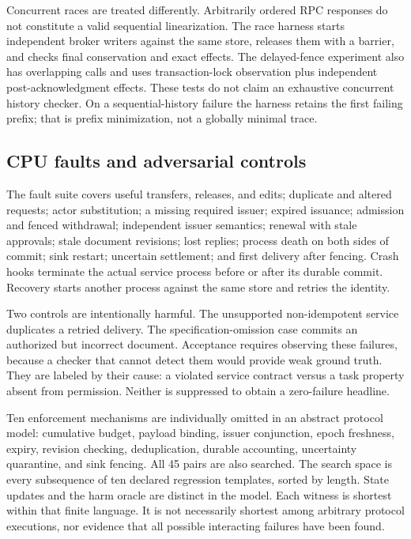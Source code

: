 Concurrent races are treated differently. Arbitrarily ordered RPC responses do
not constitute a valid sequential linearization. The race harness starts
independent broker writers against the same store, releases them with a barrier,
and checks final conservation and exact effects. The delayed-fence experiment
also has overlapping calls and uses transaction-lock observation plus independent
post-acknowledgment effects. These tests do not claim an exhaustive concurrent
history checker. On a sequential-history failure the harness retains the first
failing prefix; that is prefix minimization, not a globally minimal trace.

\subsection{CPU faults and adversarial controls}
The fault suite covers useful transfers, releases, and edits; duplicate and
altered requests; actor substitution; a missing required issuer; expired
issuance; admission and fenced withdrawal; independent issuer semantics;
renewal with stale approvals; stale document revisions; lost replies; process
death on both sides of commit; sink restart; uncertain settlement; and first
delivery after fencing. Crash hooks terminate the actual service process before
or after its durable commit. Recovery starts another process against the same
store and retries the identity.

Two controls are intentionally harmful. The unsupported non-idempotent service
duplicates a retried delivery. The specification-omission case commits an
authorized but incorrect document. Acceptance requires observing these failures,
because a checker that cannot detect them would provide weak ground truth.
They are labeled by their cause: a violated service contract versus a task
property absent from permission. Neither is suppressed to obtain a zero-failure
headline.

Ten enforcement mechanisms are individually omitted in an abstract protocol
model: cumulative budget, payload binding, issuer conjunction, epoch freshness,
expiry, revision checking, deduplication, durable accounting, uncertainty
quarantine, and sink fencing. All 45 pairs are also searched. The search space is
every subsequence of ten declared regression templates, sorted by length. State
updates and the harm oracle are distinct in the model. Each witness is shortest
within that finite language. It is not necessarily shortest among arbitrary
protocol executions, nor evidence that all possible interacting failures have
been found.

